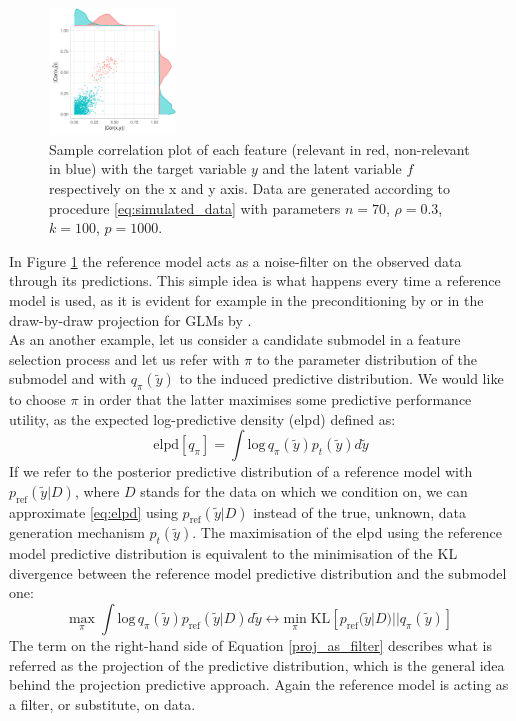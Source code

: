 \documentclass[american,]{article}
\theoremstyle{definition}
\begin{document}
\begin{figure}[tp]
  \centering
  \includegraphics[width=0.3\textwidth]{graphics/correlation.pdf}
  \caption{Sample correlation plot of each feature (relevant in red, non-relevant in blue) with the target variable $y$ and the latent variable $f$ respectively on the x and y axis. Data are generated according to procedure \eqref{eq:simulated_data} with parameters $n=70$, $\rho=0.3$, $k=100$, $p=1000$.\\}
  \label{fig:correlation}
\end{figure}

In Figure \ref{fig:correlation} the reference model acts as a noise-filter on the observed data through its predictions. This simple idea is what happens every time a reference model is used, as it is evident for example in the preconditioning by \cite{paul2008preconditioning} or in the draw-by-draw projection for GLMs by \cite{paper:original_proj}.\\
As an another example, let us consider a candidate submodel in a feature selection process and let us refer with $\pi$ to the parameter distribution of the submodel and with $q_{\pi}(\tilde{y})$ to the induced predictive distribution. We would like to choose $\pi$ in order that the latter maximises some predictive performance utility, as the expected log-predictive density (elpd) defined as:
\
\begin{equation}\label{eq:elpd}
\text{elpd}[q_{\pi}]=\int \text{log}\,q_{\pi}(\tilde{y})p_{t}(\tilde{y})d\tilde{y} 
\end{equation}
If we refer to the posterior predictive distribution of a reference model with $p_{\text{ref}}(\tilde{y}|D)$, where $D$ stands for the data on which we condition on, we can approximate \eqref{eq:elpd} using $p_{\text{ref}}(\tilde{y}|D)$ instead of the true, unknown, data generation mechanism $p_{t}(\tilde{y})$. The maximisation of the elpd using the reference model predictive distribution is equivalent to the minimisation of the KL divergence between the reference model predictive distribution and the submodel one:
\
\begin{equation} \label{proj_as_filter}
\underset{\pi}{\text{max}} \; \int \text{log}\,q_{\pi}(\tilde{y})p_{\text{ref}}(\tilde{y}|D)d\tilde{y} \leftrightarrow \underset{\pi}{\text{min}} \; \text{KL}[p_{\text{ref}}(\tilde{y}|D)||q_{\pi}(\tilde{y})] 
\end{equation}
The term on the right-hand side of Equation \eqref{proj_as_filter} describes what is referred as the projection of the predictive distribution, which is the general idea behind the projection predictive approach. Again the reference model is acting as a filter, or substitute, on data.
\end{document}
